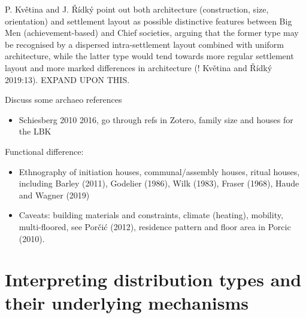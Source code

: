 \documentclass[
  12pt,
]{book}
\providecommand{\tightlist}{%
  \setlength{\itemsep}{0pt}\setlength{\parskip}{0pt}}
\begin{document}
P. Květina and J. Řídký point out both architecture (construction, size, orientation) and settlement layout as possible distinctive features between Big Men (achievement-based) and Chief societies, arguing that the former type may be recognised by a dispersed intra-settlement layout combined with uniform architecture, while the latter type would tend towards more regular settlement layout and more marked differences in architecture (! Květina and Řídký 2019:13). EXPAND UPON THIS.

Discuss some archaeo references

\begin{itemize}
\tightlist
\item
  Schiesberg 2010 2016, go through refs in Zotero, family size and houses for the LBK
\end{itemize}

Functional difference:

\begin{itemize}
\item
  Ethnography of initiation houses, communal/assembly houses, ritual houses, including Barley (2011), Godelier (1986), Wilk (1983), Fraser (1968), Haude and Wagner (2019)
\item
  Caveats: building materials and constraints, climate (heating), mobility, multi-floored, see Porčić (2012), residence pattern and floor area in Porcic (2010).
\end{itemize}

\hypertarget{distributions}{%
\section{Interpreting distribution types and their underlying mechanisms}\label{distributions}}
\end{document}
